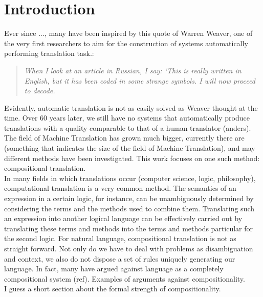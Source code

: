 \documentclass{report}
\author{}
\title{}
\theoremstyle{definition}
\theoremstyle{plain}
\begin{document}
\maketitle
\tableofcontents

\chapter{Introduction}

Ever since ..., many have been inspired by this quote of Warren Weaver, one of the very first researchers to aim for the construction of systems automatically performing translation task.:

\begin{quote}
\textit{When I look at an article in Russian, I say: `This is really written in English, but it has been coded in some strange symbols. I will now proceed to decode.}
\end{quote}

Evidently, automatic translation is not as easily solved as Weaver thought at the time. Over 60 years later, we still have no systems that automatically produce translations with a quality comparable to that of a human translator (anders). The field of Machine Translation has grown much bigger, currently there are (something that indicates the size of the field of Machine Translation), and may different methods have been investigated. This work focuses on one such method: compositional translation.\\
In many fields in which translations occur (computer science, logic, philosophy), computational translation is a very common method. The semantics of an expression in a certain logic, for instance, can be unambiguously determined by considering the terms and the methods used to combine them. Translating such an expression into another logical language can be effectively carried out by translating these terms and methods into the terms and methods particular for the second logic. For natural language, compositional translation is not as straight forward.
Not only do we have to deal with problems as disambiguation and context, we also do not dispose a set of rules uniquely generating our language. In fact, many have argued against language as a completely compositional system (ref). Examples of arguments against compositionality.\\
I guess a short section about the formal strength of compositionality.
\end{document}
